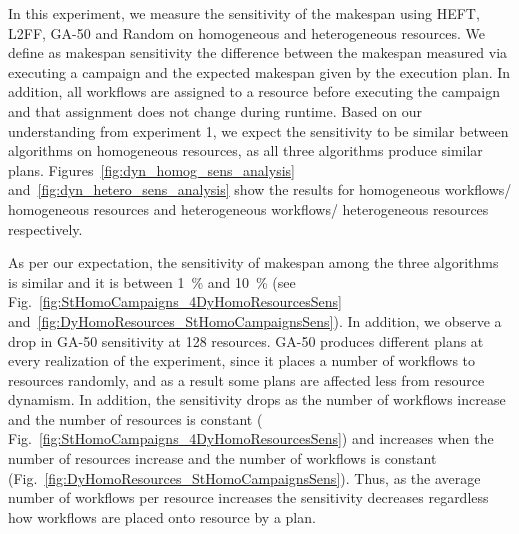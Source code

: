 In this experiment, we measure the sensitivity of the makespan using HEFT, L2FF, GA-50 and Random on homogeneous and heterogeneous resources.
We define as makespan sensitivity the difference between the makespan measured via executing a campaign and the expected makespan given by the execution plan.
In addition, all workflows are assigned to a resource before executing the campaign and that assignment does not change during runtime.
Based on our understanding from experiment 1, we expect the sensitivity to be similar between algorithms on homogeneous resources, as all three algorithms produce similar plans.
Figures~\ref{fig:dyn_homog_sens_analysis} and~\ref{fig:dyn_hetero_sens_analysis} show the results for homogeneous workflows/ homogeneous resources and heterogeneous workflows/ heterogeneous resources respectively.

As per our expectation, the sensitivity of makespan among the three algorithms is similar and it is between 1~\% and 10~\% (see Fig.~\ref{fig:StHomoCampaigns_4DyHomoResourcesSens} and~\ref{fig:DyHomoResources_StHomoCampaignsSens}).
In addition, we observe a drop in GA-50 sensitivity at 128 resources.
GA-50 produces different plans at every realization of the experiment, since it places a number of workflows to resources randomly, and as a result some plans are affected less from resource dynamism.
In addition, the sensitivity drops as the number of workflows increase and the number of resources is constant ( Fig.~\ref{fig:StHomoCampaigns_4DyHomoResourcesSens}) and increases when the number of resources increase and the number of workflows is constant (Fig.~\ref{fig:DyHomoResources_StHomoCampaignsSens}).
Thus, as the average number of workflows per resource increases the sensitivity decreases regardless how workflows are placed onto resource by a plan.


